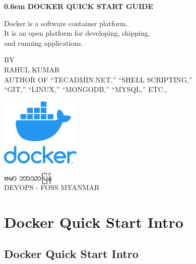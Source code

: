 \documentclass{article}
\begin{document}

\clearpage
\newcommand\nbvspace[1][3]{\vspace*{\stretch{#1}}}
\newcommand\nbstretchyspace{\spaceskip0.5em plus 0.25em minus 0.25em}
\newcommand{\nbtitlestretch}{\spaceskip0.6em}
\pagestyle{empty}
\begin{center}
\bfseries
\nbvspace[1]
\Huge
{\nbtitlestretch\huge
DOCKER QUICK START GUIDE}

\nbvspace[1]
\normalsize

Docker is a software container platform. \\
It is an open platform for developing, shipping, \\
and running applications. 
\nbvspace[1]

\small BY\\
\Large RAHUL KUMAR\\[0.5em]
\footnotesize AUTHOR OF ``TECADMIN.NET,'' ``SHELL SCRIPTING,'' \\
``GIT,'' ``LINUX,'' ``MONGODB,'' ``MYSQL,'' ETC.,

\nbvspace[2]

\includegraphics[width=1.5in]{./docker.png}
\nbvspace[3]
\normalsize

ဗမာ ဘာသာပြန်\\
\large
DEVOPS - FOSS MYANMAR
\nbvspace[1]
\end{center}


\pagebreak


\section{Docker Quick Start Intro}\label{docker-quick-start-intro}

\subsection{Docker Quick Start Intro}\label{docker-quick-start-intro-1}
\end{document}
